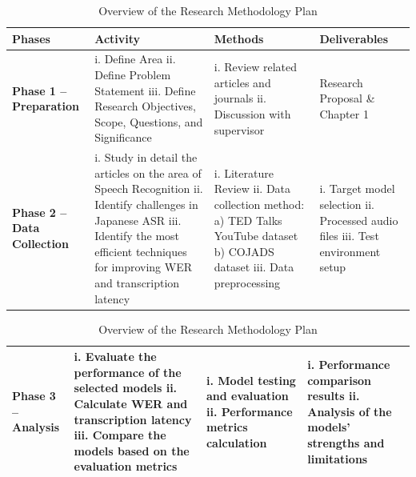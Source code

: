 \begin{table}[H]
    \centering
    \caption{Overview of the Research Methodology Plan}
    \label{tab:methodology_plan}

    \begin{tabular}{ p{2cm}|p{4cm}|p{4cm}|p{4cm} }
    \hline
    \textbf{Phases} & \textbf{Activity} & \textbf{Methods} & \textbf{Deliverables} \\
    \hline
    \hline
    
    \textbf{Phase 1 -- Preparation}
     & i. Define Area 
       \newline ii. Define Problem Statement
       \newline iii. Define Research Objectives, Scope, Questions, and Significance
     & i. Review related articles and journals
       \newline ii. Discussion with supervisor
     & Research Proposal \newline \& Chapter 1 \\
    \hline
    
    \textbf{Phase 2 -- Data Collection} 
     & i. Study in detail the articles on the area of Speech Recognition
       \newline ii. Identify challenges in Japanese ASR
       \newline iii. Identify the most efficient techniques for improving WER and transcription latency
     & i. Literature Review
       \newline ii. Data collection method:
        \newline \hspace*{1em}a) TED Talks YouTube dataset
        \newline \hspace*{1em}b) COJADS dataset
        \newline iii. Data preprocessing
     & i. Target model selection
        \newline ii. Processed audio files
        \newline iii. Test environment setup \\
    \hline
    
    \end{tabular}
    \hfill
    \begin{tabular}{ p{2cm}|p{4cm}|p{4cm}|p{4cm} }
    
    \textbf{Phase 3 -- Analysis} 
        & i. Evaluate the performance of the selected models
        \newline ii. Calculate WER and transcription latency
        \newline iii. Compare the models based on the evaluation metrics
        & i. Model testing and evaluation
        \newline ii. Performance metrics calculation
        & i. Performance comparison results
          \newline ii. Analysis of the models' strengths and limitations \\
    \hline


\end{tabular}
\end{table}
